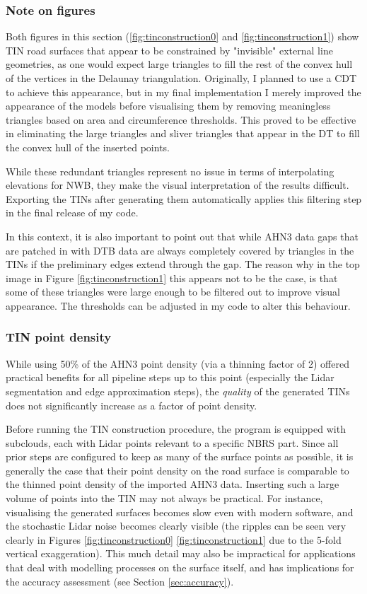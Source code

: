 \subsubsection{Note on figures}

Both figures in this section (\ref{fig:tinconstruction0} and \ref{fig:tinconstruction1}) show TIN road surfaces that appear to be constrained by "invisible" external line geometries, as one would expect large triangles to fill the rest of the convex hull of the vertices in the Delaunay triangulation. Originally, I planned to use a CDT to achieve this appearance, but in my final implementation I merely improved the appearance of the models before visualising them by removing meaningless triangles based on area and circumference thresholds. This proved to be effective in eliminating the large triangles and sliver triangles that appear in the DT to fill the convex hull of the inserted points.

While these redundant triangles represent no issue in terms of interpolating elevations for NWB, they make the visual interpretation of the results difficult. Exporting the TINs after generating them automatically applies this filtering step in the final release of my code.

In this context, it is also important to point out that while AHN3 data gaps that are patched in with DTB data are always completely covered by triangles in the TINs if the preliminary edges extend through the gap. The reason why in the top image in Figure \ref{fig:tinconstruction1} this appears not to be the case, is that some of these triangles were large enough to be filtered out to improve visual appearance. The thresholds can be adjusted in my code to alter this behaviour.

\subsubsection{TIN point density}

While using 50\% of the AHN3 point density (via a thinning factor of 2) offered practical benefits for all pipeline steps up to this point (especially the Lidar segmentation and edge approximation steps), the \textit{quality} of the generated TINs does not significantly increase as a factor of point density.

Before running the TIN construction procedure, the program is equipped with subclouds, each with Lidar points relevant to a specific NBRS part. Since all prior steps are configured to keep as many of the surface points as possible, it is generally the case that their point density on the road surface is comparable to the thinned point density of the imported AHN3 data. Inserting such a large volume of points into the TIN may not always be practical. For instance, visualising the generated surfaces becomes slow even with modern software, and the stochastic Lidar noise becomes clearly visible (the ripples can be seen very clearly in Figures \ref{fig:tinconstruction0} \ref{fig:tinconstruction1} due to the 5-fold vertical exaggeration). This much detail may also be impractical for applications that deal with modelling processes on the surface itself, and has implications for the accuracy assessment (see Section \ref{sec:accuracy}).

